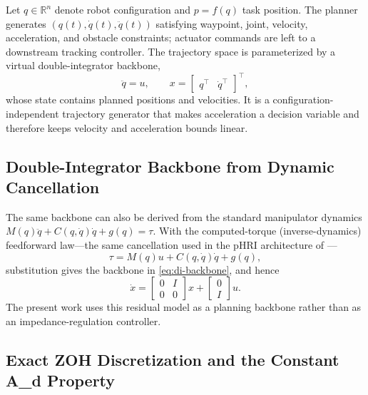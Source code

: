 Let \(q\in\mathbb{R}^n\) denote robot configuration and
\(p=f(q)\) task position. The planner generates
\((q(t),\dot q(t),\ddot q(t))\) satisfying waypoint, joint, velocity,
acceleration, and obstacle constraints; actuator commands are left to a
downstream tracking controller. The trajectory space is parameterized by
a virtual double-integrator backbone,
\begin{equation}
\label{eq:di-backbone}
  \ddot q = u,\qquad
  x=\begin{bmatrix}q^\top&\dot q^\top\end{bmatrix}^\top ,
\end{equation}
whose state contains planned positions and velocities. It is a configuration-independent
trajectory generator that makes acceleration a decision variable and
therefore keeps velocity and acceleration bounds linear.

\subsection{Double-Integrator Backbone from Dynamic
Cancellation}\label{a.-double-integrator-backbone-from-dynamic-cancellation}

The same backbone can also be derived from the standard manipulator
dynamics \(M(q)\ddot q+C(q,\dot q)\dot q+g(q)=\tau\). With the
computed-torque (inverse-dynamics) feedforward law---the same
cancellation used in the pHRI architecture of \cite{phri}---
\begin{equation}
\label{eq:computed-torque}
  \tau = M(q)u + C(q,\dot q)\dot q + g(q),
\end{equation}
substitution gives the backbone in \eqref{eq:di-backbone}, and hence
\begin{equation}
\label{eq:residual-dynamics}
\dot x = \begin{bmatrix} 0&I\\ 0&0 \end{bmatrix}x +
\begin{bmatrix} 0\\ I \end{bmatrix}u .
\end{equation}
The present work uses this residual model as a planning backbone rather
than as an impedance-regulation controller.

\subsection{Exact ZOH Discretization and the Constant A\_d Property}\label{b.-exact-zoh-discretization-and-the-constant-a_d-property}

